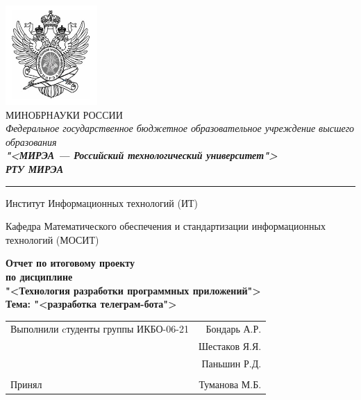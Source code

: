 \begin{titlepage}
	
	\thispagestyle{fancy}
	\renewcommand{\headrulewidth}{0pt}

	\begin{center}
		\includegraphics[scale=0.5]{./res/logo.png}\\

		МИНОБРНАУКИ РОССИИ\\
		\textit{Федеральное государственное бюджетное
		образовательное учреждение высшего образования}\\
		\textbf{\textit{"<МИРЭА --- Российский технологический
		университет">}}\\
		\textbf{\textit{\large РТУ МИРЭА}}\\

		\bigskip \hrule \smallskip

		Институт Информационных технологий (ИТ)\\

		\vfill

		Кафедра Математического обеспечения и стандартизации информационных
			технологий (МОСИТ)\\

		\vfill

		\textbf{
			Отчет по итоговому проекту\\
			по дисциплине\\
			"<Технология разработки программных приложений">\\
			Тема: "<разработка телеграм-бота">\\
		}

		\vfill
		\vfill

		\begin{small}
			\begin{tabular}{lr}
				Выполнили cтуденты группы ИКБО-06-21 & Бондарь А.Р.\\
				& Шестаков Я.Я.\\
				& Паньшин Р.Д.\\\\
				Принял & Туманова М.Б.\\
			\end{tabular}
		\end{small}


\end{center}
\end{titlepage}
